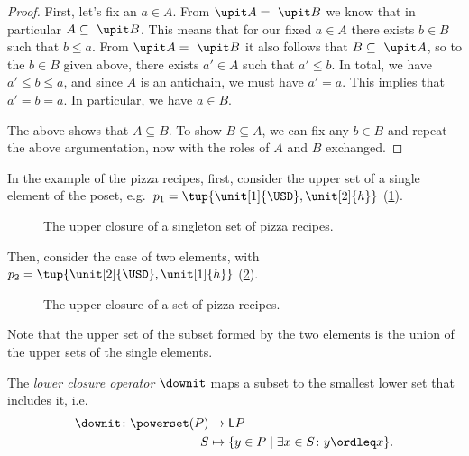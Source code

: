 \begin{proof}
    First, let's fix an $a \in A$. From $\upit  A = \ \upit  B$ we know that in particular $A \subseteq \ \upit  B$. This means that for our fixed $a \in A$ there exists $b \in B$ such that $b \leq a$. From $\upit  A = \ \upit  B$ it also follows that $B \subseteq \ \upit  A$, so to the  $b \in B$ given above, there exists $a' \in A$ such that $a' \leq b$. In total, we have $a' \leq b \leq a$, and since $A$ is an antichain, we must have $a' = a$. This implies that $a' = b = a$. In particular, we have $a \in B$.

    The above shows that $A \subseteq B$. To show $B \subseteq A$, we can fix any $b \in B$ and repeat the above argumentation, now with the roles of $A$ and $B$ exchanged.
\end{proof}

In the example of the pizza recipes, first, consider the upper set of a single element of the poset, e.g.~$p_1=\tup{\unit[1]{\USD},\unit[2]{h}}$  (\cref{fig:upperclosure_1}).
\begin{figure}[h!]
    \begin{center}
    \end{center}
    \caption{The upper closure of a singleton set of pizza recipes. \label{fig:upperclosure_1}}
\end{figure}
Then, consider the case of two elements, with~$p_2=\tup{\unit[2]{\USD},\unit[1]{h}}$ (\cref{fig:upperclosure_2}).

\begin{figure}[h!]
    \begin{center}
    \end{center}
    \caption{The upper closure of a set of pizza recipes. \label{fig:upperclosure_2}}
\end{figure}
Note that the upper set of the subset formed by the two elements is the union of the upper sets of the single elements.

\begin{definition}
    The \emph{lower closure operator} $\downit$ maps a subset to the smallest lower set that includes it, i.e.
    \begin{equation*}
        \begin{aligned}
            \downit \colon \powerset(P)&\to \mathsf{L}P\\
            S&\mapsto \{ y\in P \mid \exists x\in S \colon y\ordleq x\}.
        \end{aligned}
    \end{equation*}
\end{definition}

